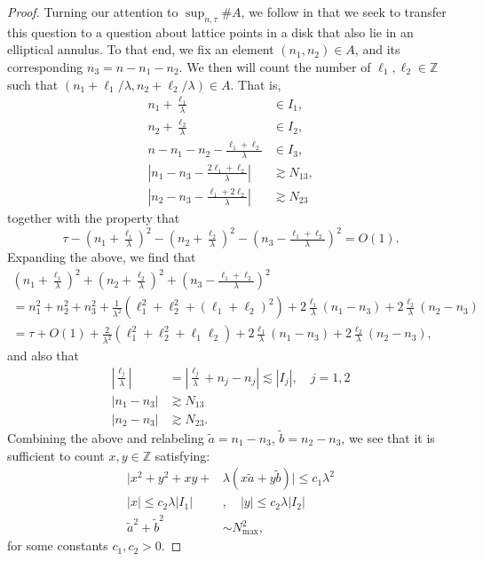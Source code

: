 \documentclass[12pt, letterpaper]{amsart}
\begin{document}
\begin{proof}
    Turning our attention to $\sup_{n,\tau}\#A$, we follow \cite{de2007global} in that we seek to transfer this question to a question about lattice points in a disk that also lie in an elliptical annulus. To that end, we fix an element $(n_1,n_2)\in A$, and its corresponding $n_3 = n-n_1-n_2$. We then will count the number of $\ell_1,\ell_2\in\mathbb{Z}$ such that $(n_1+\ell_1/\lambda, n_2+\ell_2/\lambda)\in A$. That is, 
    \begin{align*}
    n_1+\tfrac{\ell_1}{\lambda}&\in I_1,\\
    n_2+\tfrac{\ell_2}{\lambda}&\in I_2,\\
    n-n_1-n_2-\tfrac{\ell_1+\ell_2}{\lambda}&\in I_3,\\
    |n_1-n_3-\tfrac{2\ell_1+\ell_2}{\lambda}|&\gtrsim N_{13},\\
    |n_2-n_3-\frac{\ell_1+2\ell_2}{\lambda}|&\gtrsim N_{23}
    \end{align*}
    together with the property that 
    \[
    \tau - (n_1+\tfrac{\ell_1}{\lambda})^2-(n_2+\tfrac{\ell_2}{\lambda})^2 - (n_3-\tfrac{\ell_1+\ell_2}{\lambda})^2 = O(1).
    \]
    Expanding the above, we find that 
    \begin{multline*}
        (n_1+\tfrac{\ell_1}{\lambda})^2+(n_2+\tfrac{\ell_2}{\lambda})^2 + (n_3-\tfrac{\ell_1+\ell_2}{\lambda})^2\\
        = n_1^2+n_2^2+n_3^2+\frac{1}{\lambda^2}(\ell_1^2+\ell_2^2+(\ell_1+\ell_2)^2) + 2\frac{\ell_1}{\lambda}(n_1-n_3)+2\frac{\ell_2}{\lambda}(n_2-n_3)\\
        = \tau+O(1) + \frac{2}{\lambda^2}(\ell_1^2+\ell_2^2+\ell_1\ell_2)+2\frac{\ell_1}{\lambda}(n_1-n_3)+2\frac{\ell_2}{\lambda}(n_2-n_3),
    \end{multline*}
    and also that
    \begin{align*}
    \left|\frac{\ell_j}{\lambda}\right| &= \left|\frac{\ell_j}{\lambda}+n_j-n_j\right|\lesssim |I_j|,\quad j=1,2\\
    |n_1-n_3|&\gtrsim N_{13}\\
    |n_2-n_3|&\gtrsim N_{23}.
    \end{align*}
    Combining the above and relabeling $\tilde{a} = n_1-n_3$, $\tilde{b} = n_2-n_3$, we see that it is sufficient to count $x,y\in\mathbb{Z}$ satisfying:
    \begin{align}
        \big|x^2+y^2+xy+&\lambda(x\tilde{a}+y\tilde{b})\big|\leq c_1\lambda^2\label{Equation: Elliptical Annular Region Pre}\\
        |x| \leq c_2\lambda |I_1|&, \quad |y| \leq c_2\lambda|I_2|\label{Equation: Rectangular Region Pre}\\
        \tilde{a}^2+\tilde{b}^2&\sim N_{\max}^2,\nonumber
    \end{align}
    for some constants $c_1, c_2> 0$.
    

\end{proof}
\end{document}

